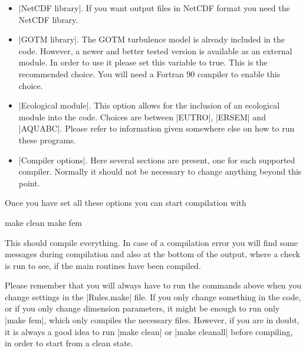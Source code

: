 \begin{itemize}
\item |NetCDF library|. If you want output files in NetCDF format
you need the NetCDF library.

\item |GOTM library|. The GOTM turbulence model is already included in
the code. However, a newer and better tested version is available as an
external module. In order to use it please set this variable to true. This
is the recommended choice. You will need a Fortran 90 compiler to enable
this choice.

\item |Ecological module|. This option allows for the inclusion of an
ecological module into the code. Choices are between |EUTRO|, |ERSEM|
and |AQUABC|. Please refer to information given somewhere else on how
to run these programs.

\item |Compiler options|. Here several sections are present, one for
each supported compiler. Normally it should not be necessary to change
anything beyond this point.

\end{itemize}

Once you have set all these options you can start compilation with

\begin{code}
    make clean
    make fem
\end{code}

This should compile everything. In case of a compilation error you will
find some messages during compilation and also at the bottom of the output,
where a check is run to see, if the main routines have been compiled.

Please remember that you will always have to run the commands above
when you change settings in the |Rules.make| file. If you only change
something in the code, or if you only change dimension parameters, it
might be enough to run only |make fem|, which only compiles the necessary
files. However, if you are in doubt, it is always a good idea to run
|make clean| or |make cleanall| before compiling, in order to start from
a clean state.

